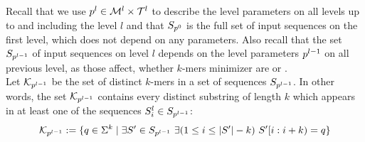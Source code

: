 \documentclass[a4paper,titlepage,onecolumn,oneside,12pt,nenglish,titlepage=firstiscover]{scrbook}
\theoremstyle{plain} %
\theoremstyle{definition} %
\theoremstyle{remark} %
\theoremstyle{plain}
\newcommand{\minimizerLength}{m}
\newcommand{\level}{l}
\newcommand{\kmer}{q}
\newcommand{\possibleMinimizerLengths}{\mathcal{M}}
\newcommand{\possibleThresholds}{\mathcal{T}}
\begin{document}
\newcommand{\compactZV}[2]{#1[#2]}
\newcommand{\manualZV}[3]{#1[#2, #3]}
\newcommand{\ZVM}[1]{\manualZV{M}{\levelParameters{#1-1}}{\parameterAccess{#1}{\minimizerLength}{#1}}}
\newcommand{\ZVK}[1]{\manualZV{K}{\levelParameters{#1-1}}{\parameterAccess{#1}{\minimizerLength}{#1}}}

\newcommand{\probabilityDistribution}[1]{p_{#1}}

\newcommand{\CDF}[1]{F_{#1}}
\newcommand{\varCDF}[1]{\textbf{F}_{#1}}

Recall that we use $\levelParameters{\level} \in \possibleMinimizerLengths^\level \times \possibleThresholds^\level$ to describe the level parameters on all levels up to and including the level $\level$ and that $S_{p^{0}}$ is the full set of input sequences on the first level, which does not depend on any parameters. Also recall that the set $\sequences{\level-1}$ of input sequences on level $\level$ depends on the level parameters $\levelParameters{\level-1}$ on all previous level, as those affect, whether $k$-mers minimizer are \frequent or \infrequent.\\

Let $\distinctKmers{\level}$ be the set of distinct $k$-mers in a set of sequences $\sequences{\level-1}$. In other words, the set $\distinctKmers{\level}$ contains every distinct substring of length $k$ which appears in at least one of the sequences $S^\level_i \in \sequences{\level-1}$:
\begin{equation}
	\distinctKmers{\level} := \{\kmer \in \Sigma^k \mid \exists S' \in \sequences{\level-1} ~ \exists (1 \leq i \leq |S'|-k) ~ S'[i:i+k) = \kmer \}
\end{equation}
\end{document}
